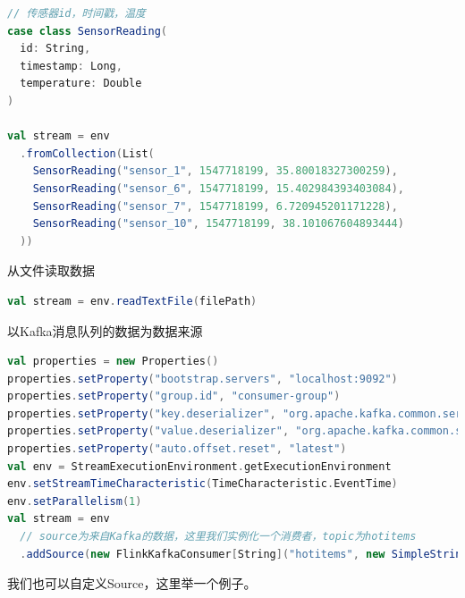 \documentclass[oneside]{ctexbook}
\begin{document}
\begin{lstlisting}[language=scala, breaklines]
// 传感器id，时间戳，温度
case class SensorReading(
  id: String,
  timestamp: Long,
  temperature: Double
)

val stream = env
  .fromCollection(List(
    SensorReading("sensor_1", 1547718199, 35.80018327300259),
    SensorReading("sensor_6", 1547718199, 15.402984393403084),
    SensorReading("sensor_7", 1547718199, 6.720945201171228),
    SensorReading("sensor_10", 1547718199, 38.101067604893444)
  ))
\end{lstlisting}

从文件读取数据

\begin{lstlisting}[language=scala, breaklines]
val stream = env.readTextFile(filePath)
\end{lstlisting}

以Kafka消息队列的数据为数据来源

\begin{lstlisting}[language=scala, breaklines]
val properties = new Properties()
properties.setProperty("bootstrap.servers", "localhost:9092")
properties.setProperty("group.id", "consumer-group")
properties.setProperty("key.deserializer", "org.apache.kafka.common.serialization.StringDeserializer")
properties.setProperty("value.deserializer", "org.apache.kafka.common.serialization.StringDeserializer")
properties.setProperty("auto.offset.reset", "latest")
val env = StreamExecutionEnvironment.getExecutionEnvironment
env.setStreamTimeCharacteristic(TimeCharacteristic.EventTime)
env.setParallelism(1)
val stream = env
  // source为来自Kafka的数据，这里我们实例化一个消费者，topic为hotitems
  .addSource(new FlinkKafkaConsumer[String]("hotitems", new SimpleStringSchema(), properties))
\end{lstlisting}

我们也可以自定义Source，这里举一个例子。
\end{document}
